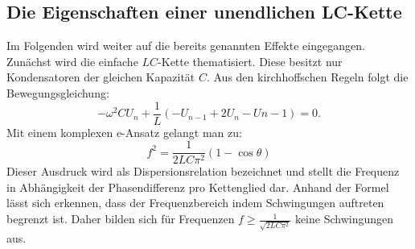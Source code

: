 \subsection{Die Eigenschaften einer unendlichen LC-Kette}

Im Folgenden wird weiter auf die bereits genannten Effekte eingegangen. Zunächst
 wird die einfache $LC$-Kette thematisiert. Diese besitzt nur Kondensatoren der
 gleichen Kapazität $C$. Aus den kirchhoffschen Regeln folgt die Bewegungsgleichung:
\begin{equation}
- \omega ^2 C U_n + \frac{1}{L} \left( -U_{n-1} + 2U_ n -U{n-1} \right) = 0\text{.}
\end{equation}
Mit einem komplexen e-Ansatz gelangt man zu:
\begin{equation}
 f ^2 = \frac{1}{2LC\pi^2}(1-\cos\theta)
\end{equation}
Dieser Ausdruck wird als Dispersionsrelation bezeichnet und stellt die Frequenz in Abhängigkeit
 der Phasendifferenz pro Kettenglied dar. Anhand der Formel lässt sich erkennen,
  dass der Frequenzbereich indem Schwingungen auftreten begrenzt ist. Daher bilden sich
   für Frequenzen $f \geq \frac{1}{\sqrt{2LC\pi^2}}$ keine Schwingungen aus.\\\\

